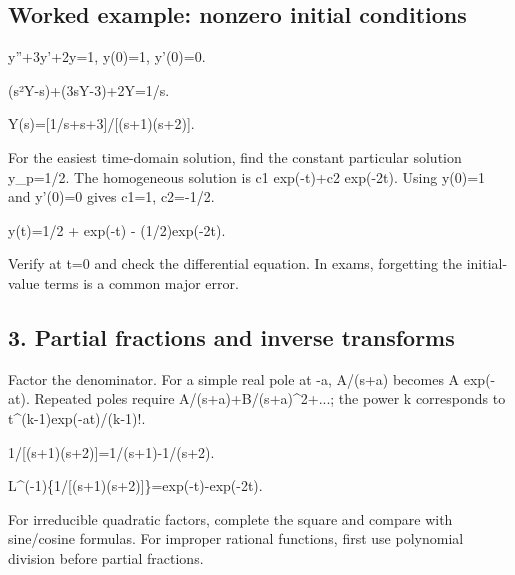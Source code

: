 \documentclass[11pt,a4paper]{article}
\begin{document}
\subsection{Worked example: nonzero initial conditions}
\begin{equationbox}\raggedright
{\ttfamily\small y''+3y'+2y=1, y(0)=1, y'(0)=0.}\par
\end{equationbox}
\begin{equationbox}\raggedright
{\ttfamily\small (s²Y-s)+(3sY-3)+2Y=1/s.}\par
\end{equationbox}
\begin{equationbox}\raggedright
{\ttfamily\small Y(s)=[1/s+s+3]/[(s+1)(s+2)].}\par
\end{equationbox}
\begin{conceptbox}For the easiest time-domain solution, find the constant particular solution y\_p=1/2. The homogeneous solution is c1 exp(-t)+c2 exp(-2t). Using y(0)=1 and y'(0)=0 gives c1=1, c2=-1/2.\end{conceptbox}
\begin{equationbox}\raggedright
{\ttfamily\small y(t)=1/2 + exp(-t) - (1/2)exp(-2t).}\par
\end{equationbox}
\begin{conceptbox}Verify at t=0 and check the differential equation. In exams, forgetting the initial-value terms is a common major error.\end{conceptbox}

\subsection{3. Partial fractions and inverse transforms}
\begin{conceptbox}Factor the denominator. For a simple real pole at -a, A/(s+a) becomes A exp(-at). Repeated poles require A/(s+a)+B/(s+a)\textasciicircum{}2+...; the power k corresponds to t\textasciicircum{}(k-1)exp(-at)/(k-1)!.\end{conceptbox}
\begin{equationbox}\raggedright
{\ttfamily\small 1/[(s+1)(s+2)]=1/(s+1)-1/(s+2).}\par
\end{equationbox}
\begin{equationbox}\raggedright
{\ttfamily\small L\textasciicircum{}(-1)\{1/[(s+1)(s+2)]\}=exp(-t)-exp(-2t).}\par
\end{equationbox}
\begin{conceptbox}For irreducible quadratic factors, complete the square and compare with sine/cosine formulas. For improper rational functions, first use polynomial division before partial fractions.\end{conceptbox}
\end{document}
